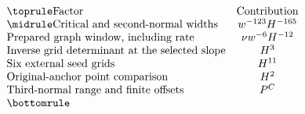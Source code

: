\documentclass[11pt]{amsart}
\theoremstyle{definition}
\theoremstyle{remark}
\numberwithin{equation}{section}
\begin{document}
\begin{table}[H]
\centering\small
\caption{Factors in the proof of Theorem~\ref{low:6:wc36:thm-main}. Powers of $P$ are suppressed except in the last row.}\label{app:table-wide-factors}
\[
\begin{array}{lc}
\toprule
\text{Factor}&\text{Contribution}\\
\midrule
\text{Critical and second-normal widths}&w^{-123}H^{-165}\\
\text{Prepared graph window, including rate}&\nu w^{-6}H^{-12}\\
\text{Inverse grid determinant at the selected slope}&H^3\\
\text{Six external seed grids}&H^{11}\\
\text{Original-anchor point comparison}&H^2\\
\text{Third-normal range and finite offsets}&P^C\\
\bottomrule
\end{array}
\]
\end{table}
\end{document}
